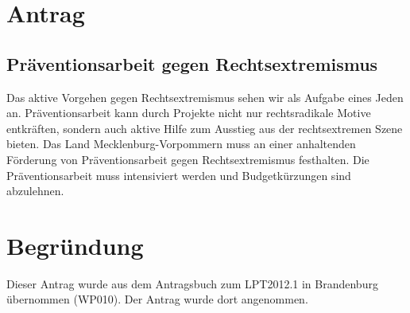 \section{Antrag}

\subsection{Präventionsarbeit gegen Rechtsextremismus}

Das aktive Vorgehen gegen Rechtsextremismus sehen wir als Aufgabe eines Jeden an. Präventionsarbeit kann durch Projekte nicht nur rechtsradikale Motive entkräften, sondern auch aktive Hilfe zum Ausstieg aus der rechtsextremen Szene bieten. Das Land Mecklenburg-Vorpommern muss an einer anhaltenden Förderung von Präventionsarbeit gegen Rechtsextremismus festhalten. Die Präventionsarbeit muss intensiviert werden und Budgetkürzungen sind abzulehnen.

\section{Begründung}

Dieser Antrag wurde aus dem Antragsbuch zum LPT2012.1 in Brandenburg übernommen (WP010). Der Antrag wurde dort angenommen.
